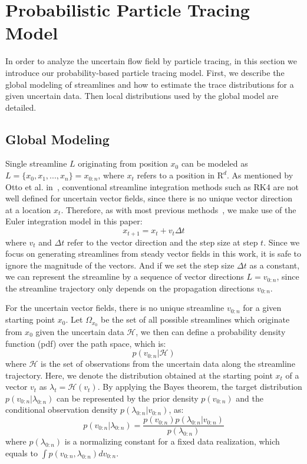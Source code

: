 \section{Probabilistic Particle Tracing Model}

In order to analyze the uncertain flow field by particle tracing, in this section we introduce our probability-based particle tracing model. First, we describe the global modeling of streamlines and how to estimate the trace distributions for a given uncertain data. Then local distributions used by the global model are detailed.

\subsection{Global Modeling}

Single streamline $L$ originating from position ${x_0}$ can be modeled as $L = \{ {x_0},{x_1},...,{x_n}\} = {x_{0:n}}$, where $x_t$ refers to a position in $\mathrm{R}^d$. As mentioned by Otto et al. in~\cite{Otto10a, Otto11a}, conventional streamline integration methods such as RK4 are not well defined for uncertain vector fields, since there is no unique vector direction at a location ${x_t}$. Therefore, as with most previous methods~\cite{Otto10a, Otto11a}, we make use of the Euler integration model in this paper:
\begin{equation}
  {x_{t + 1}} = {x_t} + {v_t}\Delta t
\end{equation}
where ${v_t}$ and $\Delta t$ refer to the vector direction and the step size at step $t$. Since we focus on generating streamlines from steady vector fields in this work, it is safe to ignore the magnitude of the vectors. And if we set the step size $\Delta t$ as a constant, we can represent the streamline by a sequence of vector directions ${L = v_{0:n}}$, since the streamline trajectory only depends on the propagation directions $v_{0:n}$.

For the uncertain vector fields, there is no unique streamline $v_{0:n}$ for a given starting point $x_0$. Let $\Omega_{x_0}$ be the set of all possible streamlines which originate from $x_0$ given the uncertain data $\mathcal{H}$, we then can define a probability density function (pdf) over the path space, which is:
\begin{equation}
  p(v_{0:n}|\mathcal{H})
\end{equation}
where $\mathcal{H}$ is the set of observations from the uncertain data along the streamline trajectory. Here, we denote the distribution obtained at the starting point $x_t$ of a vector $v_t$ as $\lambda_t=\mathcal{H}(v_t)$. By applying the Bayes theorem, the target distribution $p({v_{0:n}}|{\lambda_{0:n}})$ can be represented by the prior density $p({v_{0:n}})$ and the conditional observation density $p({\lambda_{0:n}}|{v_{0:n}})$, as:
\begin{equation}
  p({v_{0:n}}|{\lambda_{0:n}}) = \frac{{p({v_{0:n}})p({\lambda_{0:n}}|{v_{0:n}})}}{{p({\lambda_{0:n}})}}
\end{equation}
where ${p({\lambda_{0:n}})}$ is a normalizing constant for a fixed data realization, which equals to $\int {p({v_{0:n}},{\lambda_{0:n}})} d{v_{0:n}}$.

